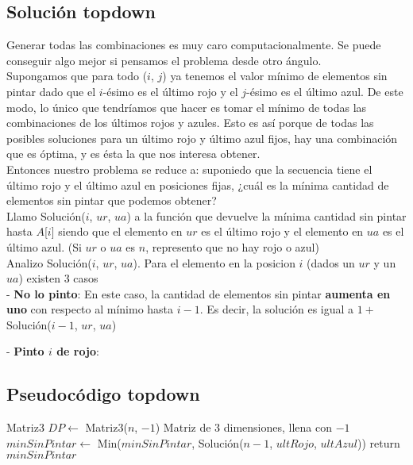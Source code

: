 \subsection{Solución topdown}

Generar todas las combinaciones es muy caro computacionalmente. Se puede conseguir algo mejor si pensamos el problema desde otro ángulo. \\

Supongamos que para todo ($i$, $j$) ya tenemos el valor mínimo de elementos sin pintar dado que el $i$-ésimo es el último rojo y el $j$-ésimo es el último azul. De este modo, lo único que tendríamos que hacer es tomar el mínimo de todas las combinaciones de los últimos rojos y azules. Esto es así porque de todas las posibles soluciones para un último rojo y último azul fijos, hay una combinación que es óptima, y es ésta la que nos interesa obtener. \\

Entonces nuestro problema se reduce a: suponiedo que la secuencia tiene el último rojo y el último azul en posiciones fijas, ¿cuál es la mínima cantidad de elementos sin pintar que podemos obtener? \\

Llamo Solución($i$, $ur$, $ua$) a la función que devuelve la mínima cantidad sin pintar hasta $A$[$i$] siendo que el elemento en $ur$ es el último rojo y el elemento en $ua$ es el último azul. (Si $ur$ o $ua$ es $n$, represento que no hay rojo o azul) \\


Analizo Solución($i$, $ur$, $ua$). Para el elemento en la posicion $i$ (dados un $ur$ y un $ua$) existen 3 casos \\

- \textbf{No lo pinto}: En este caso, la cantidad de elementos sin pintar \textbf{aumenta en uno} con respecto al mínimo hasta $i-1$. Es decir, la solución es igual a $1 + $Solución($i-1$, $ur$, $ua$)

- \textbf{Pinto $i$ de rojo}:



\subsection{Pseudocódigo topdown}

\begin{algorithm}[H]
\begin{algorithmic}
  \State Matriz3 $DP \gets$ Matriz3($n$, $-1$) \Comment Matriz de 3 dimensiones, llena con $-1$
            \State $minSinPintar \gets$ Min($minSinPintar$, Solución($n-1$, $ultRojo$, $ultAzul$))
        \EndFor
    \EndFor
    \State return $minSinPintar$
\EndProcedure
\end{algorithmic}
\end{algorithm} 


